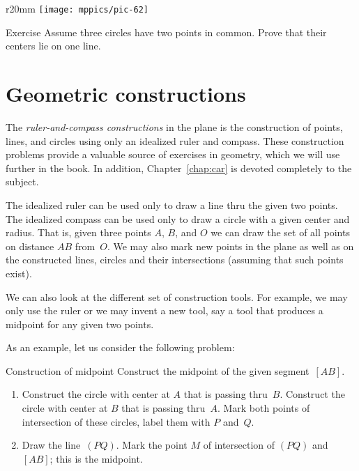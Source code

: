 {

\begin{wrapfigure}{r}{20mm}
\vskip-8mm
\centering
\texttt{[image: mppics/pic-62]}
\end{wrapfigure}

\begin{thm}{Exercise}\label{ex:tangent-circles-3}
Assume three circles have two points in common.
Prove that their centers lie on one line.
\end{thm}

}

\section*{Geometric constructions}

The \emph{ruler-and-compass constructions} in the plane is the construction of points, lines, and circles using only an idealized ruler and compass.
These construction problems provide a valuable source of exercises in geometry, 
which we will use further in the book.
In addition, Chapter~\ref{chap:car} is devoted completely to the subject.

The idealized ruler can be used only to draw a line thru the given two points.
The idealized compass can be used only to draw a circle with a given center and radius.
That is, given three points $A$, $B$, and $O$ 
we can draw the set of all points on distance $AB$ from~$O$.
We may also mark new points in the plane
as well as on the constructed lines, circles 
and their intersections (assuming that such points exist).

We can also look at the different set of construction tools.
For example,
we may only use the ruler or
we may invent a new tool, 
say a tool that produces a midpoint for any given two points.

As an example, let us consider the following problem:

\begin{thm}{Construction of midpoint}
Construct the midpoint of the given segment~$[AB]$.
\end{thm}

\begin{enumerate}[1.]
\item Construct the circle 
with center at $A$ 
that is passing thru~$B$.
 Construct the circle 
with center at $B$ 
that is passing thru~$A$.
 Mark both points of intersection of these circles, label them with $P$ and~$Q$.
\item Draw the line~$(PQ)$.
Mark the point $M$ of intersection of $(PQ)$ and $[AB]$; this is the midpoint.
\end{enumerate}

